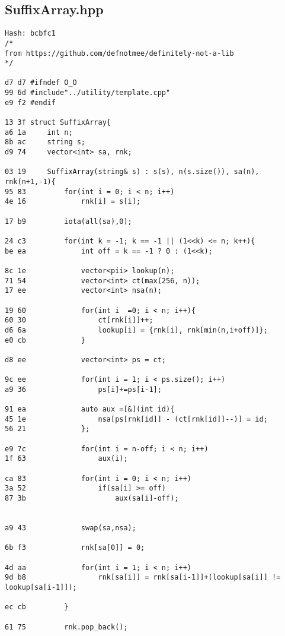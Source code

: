 \documentclass[11pt, a4paper, twoside]{article}
\begin{document}
\subsection{SuffixArray.hpp}
\begin{lstlisting}
Hash: bcbfc1
/*
from https://github.com/defnotmee/definitely-not-a-lib
*/

d7 d7 #ifndef O_O
99 6d #include"../utility/template.cpp"
e9 f2 #endif

13 3f struct SuffixArray{
a6 1a     int n;
8b ac     string s;
d9 74     vector<int> sa, rnk;
       
03 19     SuffixArray(string& s) : s(s), n(s.size()), sa(n), rnk(n+1,-1){
95 83         for(int i = 0; i < n; i++)
4e 16             rnk[i] = s[i];
              
17 b9         iota(all(sa),0);
       
24 c3         for(int k = -1; k == -1 || (1<<k) <= n; k++){
be ea             int off = k == -1 ? 0 : (1<<k);
       
8c 1e             vector<pii> lookup(n);
71 54             vector<int> ct(max(256, n));
17 ee             vector<int> nsa(n);
       
19 60             for(int i  =0; i < n; i++){
60 30                 ct[rnk[i]]++;
d6 6a                 lookup[i] = {rnk[i], rnk[min(n,i+off)]};
e0 cb             }
       
d8 ee             vector<int> ps = ct;
       
9c ee             for(int i = 1; i < ps.size(); i++)
a9 36                 ps[i]+=ps[i-1];
      
91 ea             auto aux =[&](int id){
45 1e                 nsa[ps[rnk[id]] - (ct[rnk[id]]--)] = id;
56 21             };
      
e9 7c             for(int i = n-off; i < n; i++)
1f 63                 aux(i);
                  
ca 83             for(int i = 0; i < n; i++)
3a 52                 if(sa[i] >= off)
87 3b                     aux(sa[i]-off);
      
       
a9 43             swap(sa,nsa);
       
6b f3             rnk[sa[0]] = 0;
       
4d aa             for(int i = 1; i < n; i++)
9d b8                 rnk[sa[i]] = rnk[sa[i-1]]+(lookup[sa[i]] != lookup[sa[i-1]]);
                  
ec cb         }
       
61 75         rnk.pop_back();
              

\end{lstlisting}
\end{document}
